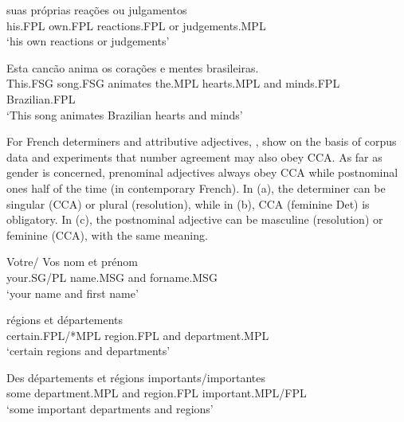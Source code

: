 \documentclass[output=paper]{langsci/langscibook}
\begin{document}
\begin{exe}
 \ex
\begin{xlista}
\ex \gll suas pr\'{o}prias rea\c{c}\~{o}es ou julgamentos \\
his.FPL own.FPL reactions.FPL or judgements.MPL \\
\glt `his own reactions or judgements'\\
\citep[435]{Villavicencio:Sadler:ea:05} 


\ex \gll Esta canc\~{a}o anima os cora\c{c}\~{o}es e mentes brasileiras. \\
 This.FSG  song.FSG animates the.MPL hearts.MPL and minds.FPL Brazilian.FPL \\
\glt `This song animates Brazilian hearts and minds'\\
\citep[437]{Villavicencio:Sadler:ea:05} 
\end{xlista}
\end{exe}

For French determiners and attributive adjectives, \citet{An:Abeille:17}, \citep{Abeille:An:Shiraishi:18} show on the basis of corpus data and experiments that number agreement may also obey CCA. As far as gender is concerned, prenominal adjectives always obey CCA while postnominal ones half of the time (in contemporary French). In (a), the determiner can be singular (CCA) or plural (resolution), while in (b), CCA (feminine Det) is obligatory. In (c), the postnominal adjective can be masculine (resolution) or feminine (CCA), with the same meaning.

\begin{exe}
 \ex
\begin{xlista}
\ex  \gll Votre/ Vos nom et pr\'{e}nom \\
your.SG/PL name.MSG and forname.MSG \\
\glt `your name and first name'\\ 
\citep{An:Abeille:17}

\ex {} r\'{e}gions et d\'{e}partements \\
certain.FPL/*MPL region.FPL and department.MPL \\
\glt `certain regions and departments'\\ \citep{Abeille:An:Shiraishi:18}

\ex \gll Des d\'{e}partements et r\'{e}gions importants/importantes\\
some department.MPL and region.FPL important.MPL/FPL\\
\glt `some important departments and regions'
\end{xlista}
\end{exe}
\end{document}
